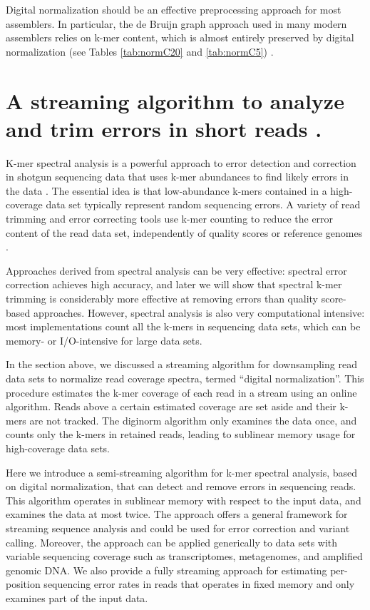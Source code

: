 Digital normalization should be an effective preprocessing approach for most
assemblers.  In particular, the de Bruijn graph approach used in many modern
assemblers relies on k-mer content, which is almost entirely preserved by
digital normalization (see Tables \ref{tab:normC20} and \ref{tab:normC5})
\cite{pubmed20211242}.




\section{A streaming algorithm to analyze and trim errors in short reads .}


K-mer spectral analysis is a powerful approach to error detection and
correction in shotgun sequencing data that uses k-mer abundances to
find likely errors in the data \cite{Pevzner2001,Li2003}. 
 The essential idea
is that low-abundance k-mers contained in a high-coverage data set typically
represent random sequencing errors.
A variety of read trimming and error correcting tools use k-mer counting to
reduce the error content of the read data set, independently of quality scores or
reference genomes \cite{Kelley2010}. 

Approaches derived
from spectral analysis can be very effective: spectral error
correction achieves high accuracy, and later we will show that
spectral k-mer trimming is considerably more effective at removing
errors than quality score-based approaches.
However, spectral analysis is also very
computational intensive: most implementations count all the k-mers in
sequencing data sets, which can be memory- or I/O-intensive for large
data sets.

In the section above, we discussed a streaming algorithm for downsampling
read data sets to normalize read coverage spectra, termed ``digital
normalization''.  This procedure
estimates the k-mer coverage of each read in a stream using an online
algorithm. Reads above a certain estimated coverage are set aside and
their k-mers are not tracked.  The diginorm algorithm only examines
the data once, and counts only the k-mers in retained reads, leading
to sublinear memory usage for high-coverage data sets.

Here we introduce a semi-streaming algorithm for k-mer spectral
analysis, based on digital normalization, that can detect and remove
errors in sequencing reads.  This algorithm operates in sublinear
memory with respect to the input data, and examines the data at most
twice.  The approach offers a general framework for streaming sequence
analysis and could be used for error correction and variant calling.
Moreover, the approach can be applied generically to data sets with
variable sequencing coverage such as transcriptomes, metagenomes, and
amplified genomic DNA.  We also provide a fully streaming approach for
estimating per-position sequencing error rates in reads that operates
in fixed memory and only examines part of the input data.


